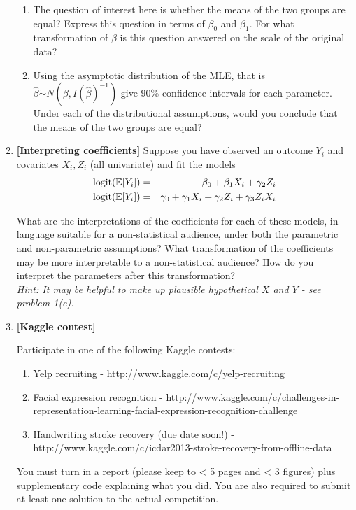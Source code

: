 \documentclass[12pt]{article}
\newcommand{\e}{\mathbb{E}}
\begin{document}
\begin{enumerate}
\begin{enumerate}
\item The question of interest here is whether the means of the two groups are equal? Express this question in terms of $\beta_0$ and $\beta_1$. For what transformation of $\beta$ is this question answered on the scale of the original data? 
\item Using the asymptotic distribution of the MLE, that is $\hat{\beta} \dot{\sim} N(\beta,I(\hat{\beta})^{-1})$ give 90\% confidence intervals for each parameter. Under each of the distributional assumptions, would you conclude that the means of the two groups are equal? 
\end{enumerate} 

\item \textbf{[Interpreting coefficients]}
Suppose you have observed an outcome $Y_i$ and covariates $X_i, Z_i$ (all univariate) and fit the models
\begin{eqnarray}
{\rm logit}(\e[Y_i]) &=& \beta_0 + \beta_1 X_i + \gamma_2 Z_i\\
{\rm logit}(\e[Y_i]) &=& \gamma_0 + \gamma_1 X_i + \gamma_2 Z_i  + \gamma_3 Z_iX_i
\end{eqnarray}

What are the interpretations of the coefficients for each of these models, in language suitable for a non-statistical audience, under both the parametric and non-parametric assumptions? What transformation of the coefficients may be more interpretable to a non-statistical audience? How do you interpret the parameters after this transformation?\\
{\it Hint: It may be helpful to make up plausible hypothetical $X$ and $Y$ - see problem 1(c).}


\item \textbf{[Kaggle contest]}

Participate in one of the following Kaggle contests: 

\begin{enumerate}
\item Yelp recruiting - http://www.kaggle.com/c/yelp-recruiting
\item Facial expression recognition - http://www.kaggle.com/c/challenges-in-representation-learning-facial-expression-recognition-challenge
\item Handwriting stroke recovery (due date soon!) - http://www.kaggle.com/c/icdar2013-stroke-recovery-from-offline-data
\end{enumerate}

You must turn in a report (please keep to < 5 pages and < 3 figures) plus supplementary code explaining what you did. You are also required to submit at least one solution to the actual competition. 

\end{enumerate}
\end{document}

